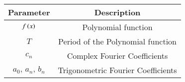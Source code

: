 \begin{tabular}[12pt]{ |c| c|}
    \hline
    \textbf{Parameter} & \textbf{Description}\\ 
    \hline
    $f\left(x\right)$ & Polynomial function\\
    \hline
    $T$& Period of the Polynomial function\\ 
    \hline
    $c_n$ & Complex Fourier Coefficients\\
    \hline
    $a_0,\,a_n,\,b_n$& Trigonometric Fourier Coefficients\\
    \hline   
    \end{tabular}
